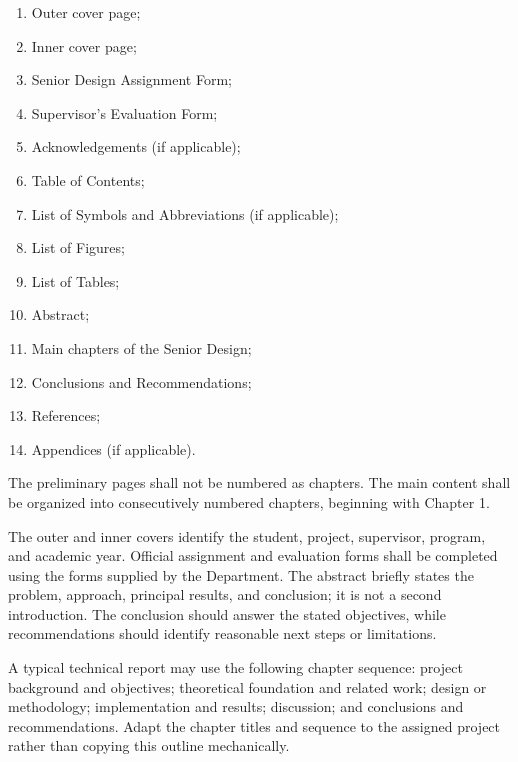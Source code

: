 {\begin{enumerate}[label=\arabic*., leftmargin=1.2cm, itemsep=2pt]
    \item Outer cover page;
    \item Inner cover page;
    \item Senior Design Assignment Form;
    \item Supervisor's Evaluation Form;
    \item Acknowledgements (if applicable);
    \item Table of Contents;
    \item List of Symbols and Abbreviations (if applicable);
    \item List of Figures;
    \item List of Tables;
    \item Abstract;
    \item Main chapters of the Senior Design;
    \item Conclusions and Recommendations;
    \item References;
    \item Appendices (if applicable).
\end{enumerate}

The preliminary pages shall not be numbered as chapters. The main
content shall be organized into consecutively numbered chapters,
beginning with Chapter 1.


The outer and inner covers identify the student, project, supervisor,
program, and academic year. Official assignment and evaluation forms
shall be completed using the forms supplied by the Department. The
abstract briefly states the problem, approach, principal results, and
conclusion; it is not a second introduction. The conclusion should
answer the stated objectives, while recommendations should identify
reasonable next steps or limitations.

\RegExample A typical technical report may use the following chapter
sequence: project background and objectives; theoretical foundation
and related work; design or methodology; implementation and results;
discussion; and conclusions and recommendations. Adapt the chapter
titles and sequence to the assigned project rather than copying this
outline mechanically.

\vspace{0.3cm}


}
